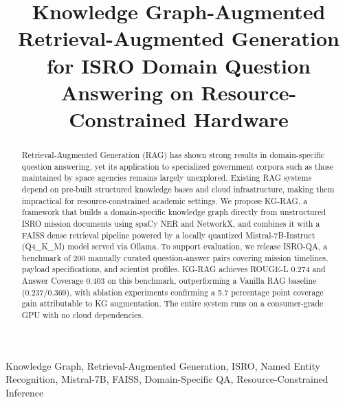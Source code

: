 \documentclass[conference]{IEEEtran}
\begin{document}
\title{Knowledge Graph-Augmented Retrieval-Augmented Generation for ISRO Domain Question Answering on Resource-Constrained Hardware}

\author{
\and
{}
}

\maketitle

\begin{abstract}
Retrieval-Augmented Generation (RAG) has shown strong results in domain-specific question answering, yet its application to specialized government corpora such as those maintained by space agencies remains largely unexplored. Existing RAG systems depend on pre-built structured knowledge bases and cloud infrastructure, making them impractical for resource-constrained academic settings. We propose KG-RAG, a framework that builds a domain-specific knowledge graph directly from unstructured ISRO mission documents using spaCy NER and NetworkX, and combines it with a FAISS dense retrieval pipeline powered by a locally quantized Mistral-7B-Instruct (Q4\_K\_M) model served via Ollama. To support evaluation, we release ISRO-QA, a benchmark of 200 manually curated question-answer pairs covering mission timelines, payload specifications, and scientist profiles. KG-RAG achieves ROUGE-L 0.274 and Answer Coverage 0.403 on this benchmark, outperforming a Vanilla RAG baseline (0.237/0.369), with ablation experiments confirming a 5.7 percentage point coverage gain attributable to KG augmentation. The entire system runs on a consumer-grade GPU with no cloud dependencies.
\end{abstract}

\begin{IEEEkeywords}
Knowledge Graph, Retrieval-Augmented Generation, ISRO, Named Entity Recognition, Mistral-7B, FAISS, Domain-Specific QA, Resource-Constrained Inference
\end{IEEEkeywords}
\end{document}
